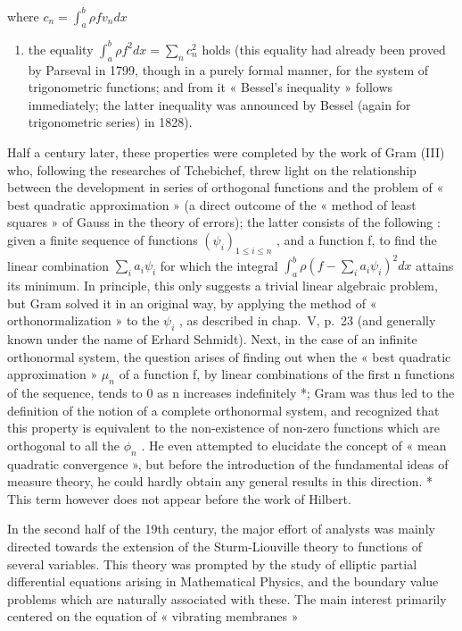 where \(c_{n} = \int_{a}^{b}\rho fv_{n}dx\)

\begin{enumerate}
\def\labelenumi{\arabic{enumi})}
\setcounter{enumi}{3}
\tightlist
\item
  the equality \(\int_{a}^{b}\rho f^2 dx = \sum_n c_n^2\) holds (this equality had already been proved by Parseval in 1799, though in a purely formal manner, for the system of trigonometric functions; and from it « Bessel's inequality » follows immediately; the latter inequality was announced by Bessel (again for trigonometric series) in 1828).
\end{enumerate}

Half a century later, these properties were completed by the work of Gram (III) who, following the researches of Tchebichef, threw light on the relationship between the development in series of orthogonal functions and the problem of « best quadratic approximation » (a direct outcome of the « method of least squares » of Gauss in the theory of errors); the latter consists of the following : given a finite sequence of functions \((\psi_{i})_{1\leqslant i\leqslant n}\) , and a function f, to find the linear combination \(\sum_{i}a_{i}\psi_{i}\) for which the integral \(\int_{a}^{b}\rho (f - \sum_{i}a_{i}\psi_{i})^{2}dx\) attains its minimum. In principle, this only suggests a trivial linear algebraic problem, but Gram solved it in an original way, by applying the method of « orthonormalization » to the \(\psi_{i}\) , as described in chap.~V, p.~23 (and generally known under the name of Erhard Schmidt). Next, in the case of an infinite orthonormal system, the question arises of finding out when the « best quadratic approximation » \(\mu_{n}\) of a function f, by linear combinations of the first n functions of the sequence, tends to 0 as n increases indefinitely *; Gram was thus led to the definition of the notion of a complete orthonormal system, and recognized that this property is equivalent to the non-existence of non-zero functions which are orthogonal to all the \(\phi_{n}\) . He even attempted to elucidate the concept of « mean quadratic convergence », but before the introduction of the fundamental ideas of measure theory, he could hardly obtain any general results in this direction.
* This term however does not appear before the work of Hilbert.

In the second half of the 19th century, the major effort of analysts was mainly directed towards the extension of the Sturm-Liouville theory to functions of several variables. This theory was prompted by the study of elliptic partial differential equations arising in Mathematical Physics, and the boundary value problems which are naturally associated with these. The main interest primarily centered on the equation of « vibrating membranes »

